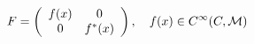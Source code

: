 \begin{equation}\label{0FORM}
F = \left(
    \begin{array}{cc}
     f(x) & 0      \\
     0    & f^*(x)
\end{array}
\right), ~~~ f(x) \in C^\infty( C, {\cal M})
\end{equation}

